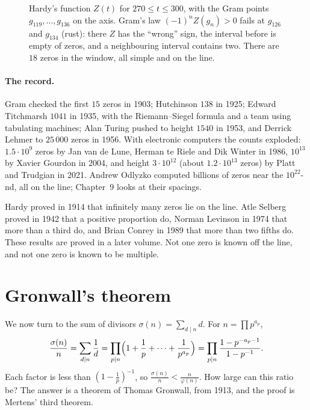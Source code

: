 \begin{figure}[ht]
\centering
{}
\caption{Hardy's function $Z(t)$ for $270\le t\le300$, with the Gram points $g_{119},\dots,g_{136}$ on the axis. Gram's law $(-1)^nZ(g_n)>0$ fails at
$g_{126}$ and $g_{134}$ (rust): there $Z$ has the ``wrong'' sign, the interval before is empty of zeros, and a neighbouring interval contains two. There
are $18$ zeros in the window, all simple and on the line.}
\label{conjectures:fig:gram}
\end{figure}

\paragraph{The record.} Gram checked the first $15$ zeros in 1903; Hutchinson $138$ in 1925; Edward Titchmarsh $1041$ in 1935, with the Riemann--Siegel
formula and a team using tabulating machines; Alan Turing pushed to height $1540$ in 1953, and Derrick Lehmer to $25\,000$ zeros in 1956. With
electronic computers the counts exploded: $1.5\cdot10^9$ zeros by Jan van de Lune, Herman te Riele and Dik Winter in 1986, $10^{13}$ by Xavier Gourdon in
2004, and height $3\cdot10^{12}$ (about $1.2\cdot10^{13}$ zeros) by Platt and Trudgian in 2021. Andrew Odlyzko computed billions of zeros near the
$10^{22}$-nd, all on the line; Chapter~9 looks at their spacings.

\begin{remark}\label{conjectures:rem:hardy}
Hardy proved in 1914 that infinitely many zeros lie on the line. Atle Selberg proved in 1942 that a positive proportion do, Norman Levinson in 1974
that more than a third do, and Brian Conrey in 1989 that more than two fifths do. These results are proved in a later volume. Not one zero is known off the line,
and not one zero is known to be multiple.
\end{remark}

\section{Gronwall's theorem}

We now turn to the sum of divisors $\sigma(n)=\sum_{d\mid n}d$. For $n=\prod p^{a_p}$,
\[
\frac{\sigma(n)}n=\sum_{d\mid n}\frac1d=\prod_{p\mid n}\Bigl(1+\frac1p+\dots+\frac1{p^{a_p}}\Bigr)=\prod_{p\mid n}\frac{1-p^{-a_p-1}}{1-p^{-1}}.
\]
Each factor is less than $(1-\frac1p)^{-1}$, so $\frac{\sigma(n)}n<\frac n{\varphi(n)}$. How large can this ratio be? The answer is a theorem of Thomas
Gronwall, from 1913, and the proof is Mertens' third theorem.

